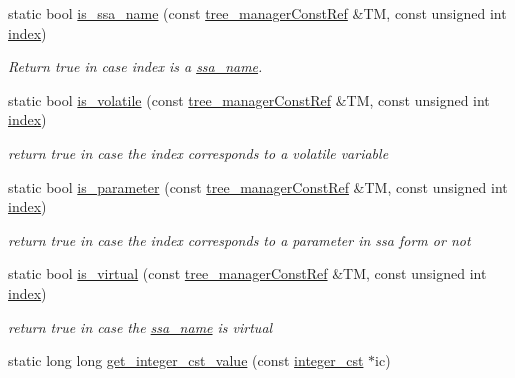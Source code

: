 \begin{DoxyCompactItemize}
static bool \hyperlink{classtree__helper_ad4b926e495f820818638a879ba292f4b}{is\+\_\+ssa\+\_\+name} (const \hyperlink{tree__manager_8hpp_a792e3f1f892d7d997a8d8a4a12e39346}{tree\+\_\+manager\+Const\+Ref} \&TM, const unsigned int \hyperlink{tutorial__pact__2019_2Introduction_2third_2include_2Keccak_8h_a028c9bdc8344cca38ab522a337074797}{index})
\begin{DoxyCompactList}\small\item\em Return true in case index is a \hyperlink{structssa__name}{ssa\+\_\+name}. \end{DoxyCompactList}\item 
static bool \hyperlink{classtree__helper_ae79793b8505fcb90640915552fa680bc}{is\+\_\+volatile} (const \hyperlink{tree__manager_8hpp_a792e3f1f892d7d997a8d8a4a12e39346}{tree\+\_\+manager\+Const\+Ref} \&TM, const unsigned int \hyperlink{tutorial__pact__2019_2Introduction_2third_2include_2Keccak_8h_a028c9bdc8344cca38ab522a337074797}{index})
\begin{DoxyCompactList}\small\item\em return true in case the index corresponds to a volatile variable \end{DoxyCompactList}\item 
static bool \hyperlink{classtree__helper_a710ad60447604c98f49d4d49359071a1}{is\+\_\+parameter} (const \hyperlink{tree__manager_8hpp_a792e3f1f892d7d997a8d8a4a12e39346}{tree\+\_\+manager\+Const\+Ref} \&TM, const unsigned int \hyperlink{tutorial__pact__2019_2Introduction_2third_2include_2Keccak_8h_a028c9bdc8344cca38ab522a337074797}{index})
\begin{DoxyCompactList}\small\item\em return true in case the index corresponds to a parameter in ssa form or not \end{DoxyCompactList}\item 
static bool \hyperlink{classtree__helper_a781409acb18b2d81e9eaa3dcec97f90d}{is\+\_\+virtual} (const \hyperlink{tree__manager_8hpp_a792e3f1f892d7d997a8d8a4a12e39346}{tree\+\_\+manager\+Const\+Ref} \&TM, const unsigned int \hyperlink{tutorial__pact__2019_2Introduction_2third_2include_2Keccak_8h_a028c9bdc8344cca38ab522a337074797}{index})
\begin{DoxyCompactList}\small\item\em return true in case the \hyperlink{structssa__name}{ssa\+\_\+name} is virtual \end{DoxyCompactList}\item 
static long long \hyperlink{classtree__helper_a697d99d005531eaac44d83d19225f02b}{get\+\_\+integer\+\_\+cst\+\_\+value} (const \hyperlink{structinteger__cst}{integer\+\_\+cst} $\ast$ic)

\end{DoxyCompactItemize}

